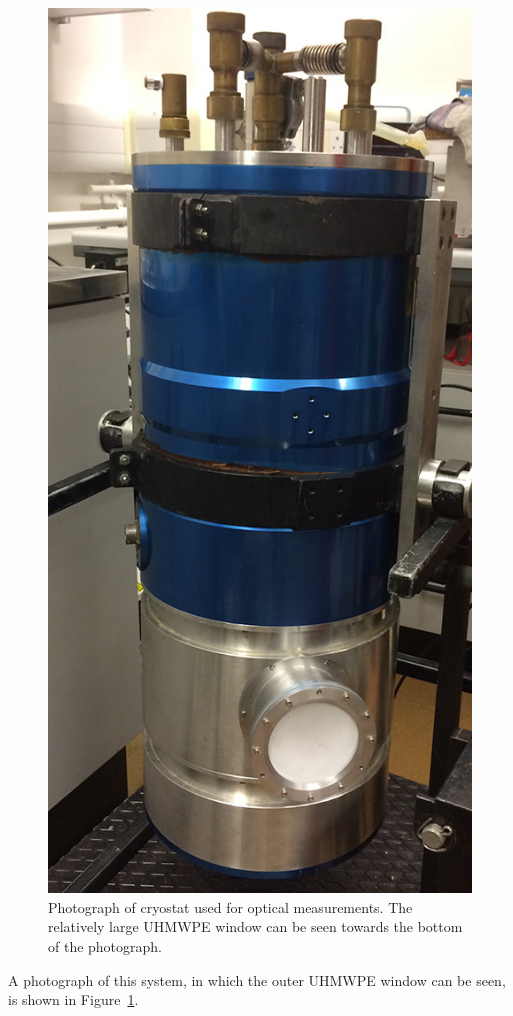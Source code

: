 \begin{figure}[tb]
\begin{center}
\includegraphics[height = 0.5\textheight]{figures/CookieMonster}
\caption[Photograph of cryostat used for optical measurements]{Photograph of cryostat used for optical measurements. The relatively large UHMWPE window can be seen towards the bottom of the photograph.}
\label{fig:CookieMonster}
\end{center}
\end{figure}
A photograph of this system, in which the outer UHMWPE window can be seen, is shown in Figure~\ref{fig:CookieMonster}.
%
